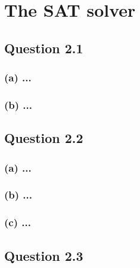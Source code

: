 \section{The SAT solver}
\subsection*{Question 2.1}
\subsubsection*{(a) \mdseries ...}
\subsubsection*{(b) \mdseries ...}

\subsection*{Question 2.2}
\subsubsection*{(a) \mdseries ...}
\subsubsection*{(b) \mdseries ...}
\subsubsection*{(c) \mdseries ...}

\subsection*{Question 2.3}